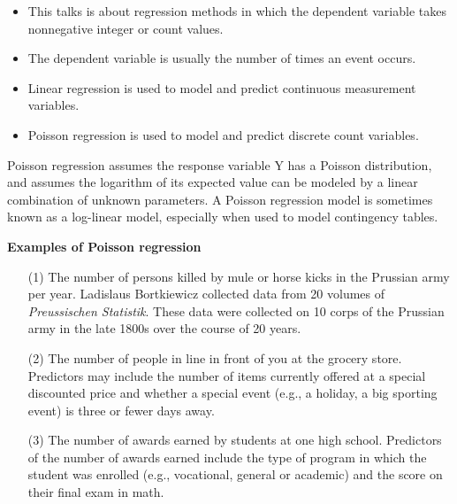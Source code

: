 \documentclass[MASTER.tex]{subfiles}
\begin{document}
\begin{frame}
	\Large
\begin{itemize}
\item This talks is about regression methods in which the dependent variable takes
nonnegative integer or count values. \item The dependent variable is usually the number of times an event occurs. 
\end{itemize}
\end{frame}
\begin{frame}[fragile]
	\begin{itemize}
		\item Linear regression is used to model and predict continuous measurement variables.
		\item Poisson regression is used to model and predict discrete count variables.
	\end{itemize}
	Poisson regression assumes the response variable Y has a Poisson distribution, and assumes the logarithm of its expected value can be modeled by a linear combination of unknown parameters. A Poisson regression model is sometimes known as a log-linear model, especially when used to model contingency tables.
	
\end{frame}
\begin{frame}[fragile]
	\textbf{Examples of Poisson regression}
	\begin{itemize}
		\item[(1) ]The number of persons killed by mule or horse kicks in the Prussian army per year. Ladislaus Bortkiewicz collected data from 20 volumes of\textit{ Preussischen Statistik}. These data were collected on 10 corps of the Prussian army in the late 1800s over the course of 20 years.
		
		\item[(2)] The number of people in line in front of you at the grocery store. Predictors may include the number of items currently offered at a special discounted price and whether a special event (e.g., a holiday, a big sporting event) is three or fewer days away.
		
		\item[(3)] The number of awards earned by students at one high school. Predictors of the number of awards earned include the type of program in which the student was enrolled (e.g., vocational, general or academic) and the score on their final exam in math.
	\end{itemize}
\end{frame}
\end{document}
